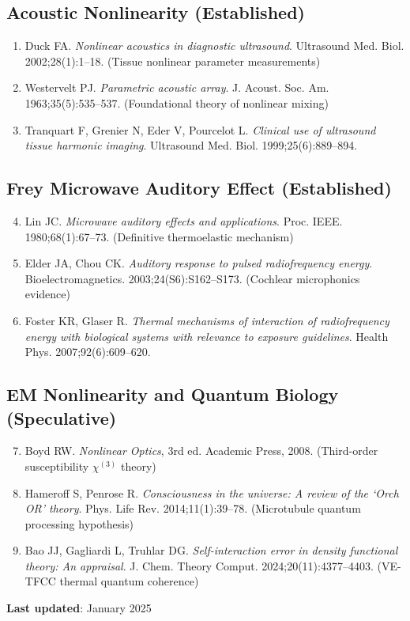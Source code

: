 \subsection*{Acoustic Nonlinearity (Established)}

\begin{enumerate}
\item Duck FA. \textit{Nonlinear acoustics in diagnostic ultrasound}. Ultrasound Med. Biol. 2002;28(1):1--18. (Tissue nonlinear parameter measurements)

\item Westervelt PJ. \textit{Parametric acoustic array}. J. Acoust. Soc. Am. 1963;35(5):535--537. (Foundational theory of nonlinear mixing)

\item Tranquart F, Grenier N, Eder V, Pourcelot L. \textit{Clinical use of ultrasound tissue harmonic imaging}. Ultrasound Med. Biol. 1999;25(6):889--894.
\end{enumerate}

\subsection*{Frey Microwave Auditory Effect (Established)}

\begin{enumerate}
\setcounter{enumi}{3}
\item Lin JC. \textit{Microwave auditory effects and applications}. Proc. IEEE. 1980;68(1):67--73. (Definitive thermoelastic mechanism)

\item Elder JA, Chou CK. \textit{Auditory response to pulsed radiofrequency energy}. Bioelectromagnetics. 2003;24(S6):S162--S173. (Cochlear microphonics evidence)

\item Foster KR, Glaser R. \textit{Thermal mechanisms of interaction of radiofrequency energy with biological systems with relevance to exposure guidelines}. Health Phys. 2007;92(6):609--620.
\end{enumerate}

\subsection*{EM Nonlinearity and Quantum Biology (Speculative)}

\begin{enumerate}
\setcounter{enumi}{6}
\item Boyd RW. \textit{Nonlinear Optics}, 3rd ed. Academic Press, 2008. (Third-order susceptibility $\chi^{(3)}$ theory)

\item Hameroff S, Penrose R. \textit{Consciousness in the universe: A review of the `Orch OR' theory}. Phys. Life Rev. 2014;11(1):39--78. (Microtubule quantum processing hypothesis)

\item Bao JJ, Gagliardi L, Truhlar DG. \textit{Self-interaction error in density functional theory: An appraisal}. J. Chem. Theory Comput. 2024;20(11):4377--4403. (VE-TFCC thermal quantum coherence)
\end{enumerate}

\vspace{1em}
\noindent\textbf{Last updated}: January 2025
